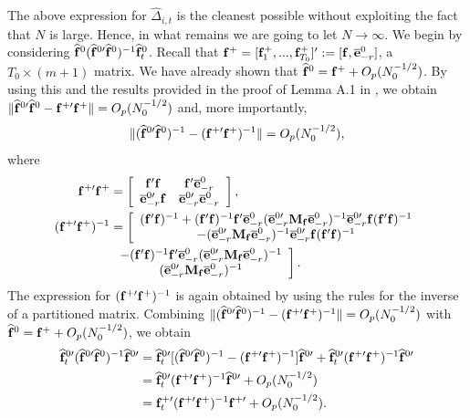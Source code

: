 \documentclass[12pt,fleqn]{article}
\begin{document}
The above expression for $\widehat \Delta_{i,t}$ is the cleanest possible without exploiting the fact that $N$ is large. Hence, in what remains we are going to let $N\to\infty$. We begin by considering $\widehat{\mathbf{f}}^{0} (\widehat{\mathbf{f}}^{0\prime}\widehat{\mathbf{f}}^0)^{-1}\widehat{\mathbf{f}}_t^0$. Recall that $\mathbf{f}^+ = [\mathbf{f}_1^+,..., \mathbf{f}_{T_0}^+]' := [\mathbf{f}, \overline{\mathbf{e}}_{-r}^{0}]$, a $T_0\times (m+1)$ matrix. We have already shown that $\widehat{\mathbf{f}}^0 = \mathbf{f}^+ +  O_p(N_0^{-1/2})$. By using this and the results provided in the proof of Lemma A.1 in \citet{westerlund2019cce}, we obtain $\|\widehat{\mathbf{f}}^{0\prime}\widehat{\mathbf{f}}^0 - \mathbf{f}^{+\prime}\mathbf{f}^+\|= O_p(N_0^{-1/2})$ and, more importantly,
\begin{align}
\|(\widehat{\mathbf{f}}^{0\prime}\widehat{\mathbf{f}}^0 )^{-1} - (\mathbf{f}^{+\prime}\mathbf{f}^+)^{-1}\| = O_p(N_0^{-1/2}),
\end{align}
where
\begin{align}
\mathbf{f}^{+\prime}\mathbf{f}^+ &= \left[\begin{array}{cc} \mathbf{f}'\mathbf{f} & \mathbf{f}'\overline{\mathbf{e}}_{-r}^0 \\ \overline{\mathbf{e}}_{-r}^{0\prime}\mathbf{f}  & \overline{\mathbf{e}}_{-r}^{0\prime}\overline{\mathbf{e}}_{-r}^0 \end{array}\right] ,\\
(\mathbf{f}^{+\prime}\mathbf{f}^+)^{-1} &= \left[\begin{array}{c} (\mathbf{f}'\mathbf{f})^{-1} + (\mathbf{f}'\mathbf{f})^{-1}\mathbf{f}'\overline{\mathbf{e}}_{-r}^0(\overline{\mathbf{e}}_{-r}^{0\prime}\mathbf{M}_{\mathbf{f}}\overline{\mathbf{e}}_{-r}^0)^{-1}\overline{\mathbf{e}}_{-r}^{0\prime} \mathbf{f}(\mathbf{f}'\mathbf{f})^{-1}  \\
-(\overline{\mathbf{e}}_{-r}^{0\prime}\mathbf{M}_{\mathbf{f}}\overline{\mathbf{e}}_{-r}^0)^{-1}\overline{\mathbf{e}}_{-r}^{0\prime}\mathbf{f} (\mathbf{f}'\mathbf{f})^{-1} \end{array}\right. \notag\\
& \left. \begin{array}{c}  -(\mathbf{f}'\mathbf{f})^{-1}\mathbf{f}'\overline{\mathbf{e}}_{-r}^0(\overline{\mathbf{e}}_{-r}^{0\prime}\mathbf{M}_{\mathbf{f}}\overline{\mathbf{e}}_{-r}^0)^{-1} \\
 (\overline{\mathbf{e}}_{-r}^{0\prime}\mathbf{M}_{\mathbf{f}}\overline{\mathbf{e}}_{-r}^0)^{-1} \end{array}\right].
\end{align}
The expression for $(\mathbf{f}^{+\prime}\mathbf{f}^+)^{-1}$ is again obtained by using the rules for the inverse of a partitioned matrix. Combining $\|(\widehat{\mathbf{f}}^{0\prime}\widehat{\mathbf{f}}^0 )^{-1} - (\mathbf{f}^{+\prime}\mathbf{f}^+)^{-1}\| = O_p(N_0^{-1/2})$ with $\widehat{\mathbf{f}}^0 = \mathbf{f}^+ +  O_p(N_0^{-1/2})$, we obtain
\begin{align}
\widehat{\mathbf{f}}_t^{0\prime}(\widehat{\mathbf{f}}^{0\prime}\widehat{\mathbf{f}}^0)^{-1}\widehat{\mathbf{f}}^{0\prime} & =  \widehat{\mathbf{f}}_t^{0\prime}[(\widehat{\mathbf{f}}^{0\prime}\widehat{\mathbf{f}}^0)^{-1} - (\mathbf{f}^{+\prime}\mathbf{f}^+)^{-1} ]\widehat{\mathbf{f}}^{0\prime} + \widehat{\mathbf{f}}_t^{0\prime}(\mathbf{f}^{+\prime}\mathbf{f}^+)^{-1}\widehat{\mathbf{f}}^{0\prime} \notag\\
& = \widehat{\mathbf{f}}_t^{0\prime}(\mathbf{f}^{+\prime}\mathbf{f}^+)^{-1}\widehat{\mathbf{f}}^{0\prime} + O_p(N_0^{-1/2})\notag\\
& = \mathbf{f}_t^{+\prime}(\mathbf{f}^{+\prime}\mathbf{f}^+)^{-1}\mathbf{f}^{+\prime} + O_p(N_0^{-1/2}).
\end{align}
\end{document}
